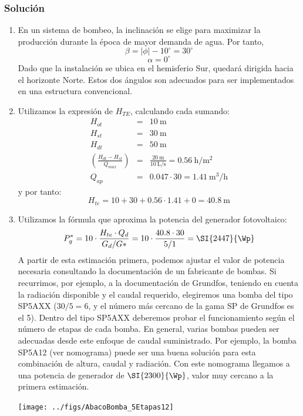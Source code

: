 \subsubsection{Solución}

\begin{enumerate}
\item En un sistema de bombeo, la inclinación se elige para maximizar
  la producción durante la época de mayor demanda de agua. Por
  tanto, \[ \beta=|\phi|-10^{\circ}=30^{\circ}\]
  \[
  \alpha=0^{\circ}\] Dado que la instalación se ubica en el hemisferio
  Sur, quedará dirigida hacia el horizonte Norte. Estos dos ángulos
  son adecuados para ser implementados en una estructura convencional.
\item Utilizamos la expresión de $H_{TE}$, calculando cada
  sumando:\begin{eqnarray*}
    H_{ot} & = & \SI{10}{\meter}\\
    H_{st} & = & \SI{30}{\meter}\\
    H_{dt} & = & \SI{50}{\meter}\\
    (\frac{H_{dt}-H_{st}}{Q_{max}}) & = & \frac{\SI{20}{\meter}}{\SI{10}{\liter\per\second}}=\SI{0.56}{\hour\per\meter\squared}\\
    Q_{ap} & = &
    0.047\cdot30=\SI{1.41}{\meter\cubed\per\hour}\end{eqnarray*} y por
  tanto:\[ H_{te}=10+30+0.56\cdot1.41+0=\SI{40.8}{\meter}\]

\item Utilizamos la fórmula que aproxima la potencia del generador
  fotovoltaico:\[ P_{g}^{*}=10\cdot\frac{H_{te}\cdot
    Q_{d}}{G_{d}/G*}=10\cdot\frac{40.8\cdot30}{5/1}=\SI{2447}{\Wp}\]
  A partir de esta estimación primera, podemos ajustar el valor de
  potencia necesaria consultando la documentación de un fabricante de
  bombas.  Si recurrimos, por ejemplo, a la documentación de Grundfos,
  teniendo en cuenta la radiación disponible y el caudal requerido,
  elegiremos una bomba del tipo SP5AXX ($30/5=6$, y el número más
  cercano de la gama SP de Grundfos es el 5). Dentro del tipo SP5AXX
  deberemos probar el funcionamiento según el número de etapas de cada
  bomba. En general, varias bombas pueden ser adecuadas desde este
  enfoque de caudal suministrado.  Por ejemplo, la bomba SP5A12 (ver
  nomograma)%
  puede ser una buena solución para esta combinación de altura, caudal
  y radiación. Con este nomograma llegamos a una potencia de generador
  de $\SI{2300}{\Wp}$, valor muy cercano a la primera
  estimación.
  \\
%
  \begin{center}
    \texttt{[image: ../figs/AbacoBomba\_5Etapas12]}


\end{center}
\end{enumerate}
